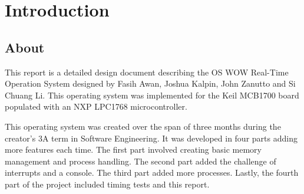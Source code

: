 \documentclass[se]{uw-wkrpt}
\begin{document}
\frontmatter


\setcounter{tocdepth}{1}

\tableofcontents
\listoffigures
\listoftables

\mainmatter

\section{Introduction}\label{sec:intro}

\subsection{About}

This report is a detailed design document describing the OS WOW Real-Time Operation System designed by Fasih Awan, Joshua Kalpin, John Zanutto and Si Chuang Li. This operating system was implemented for the Keil MCB1700 board populated with an NXP LPC1768 microcontroller. 

This operating system was created over the span of three months during the creator's 3A term in Software Engineering. It was developed in four parts adding more features each time. The first part involved creating basic memory management and process handling. The second part added the challenge of interrupts and a console. The third part added more processes. Lastly, the fourth part of the project included timing tests and this report.
\end{document}
